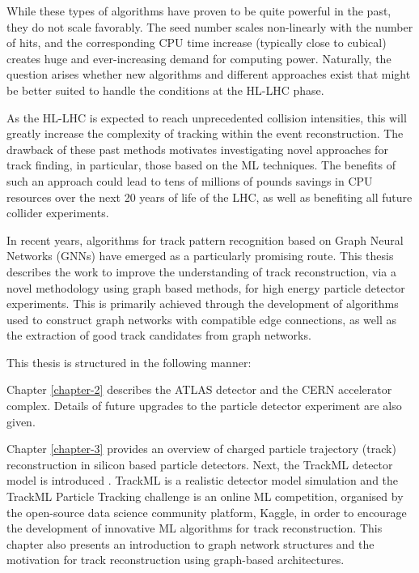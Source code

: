 While these types of algorithms have proven to be quite powerful in the past, they do not scale favorably. The seed number scales non-linearly with the number of hits, and the corresponding CPU time increase (typically close to cubical) creates huge and ever-increasing demand for computing power. Naturally, the question arises whether new algorithms and different approaches exist that might be better suited to handle the conditions at the \ac{HL-LHC} phase.

As the \ac{HL-LHC} is expected to reach unprecedented collision intensities, this will greatly increase the complexity of tracking within the event reconstruction. The drawback of these past methods motivates investigating novel approaches for track finding, in particular, those based on the \ac{ML} techniques. The benefits of such an approach could lead to tens of millions of pounds savings in CPU resources over the next 20 years of life of the \ac{LHC}, as well as benefiting all future collider experiments.

In recent years, algorithms for track pattern recognition based on Graph Neural Networks (GNNs) have emerged as a particularly promising route. This thesis describes the work to improve the understanding of track reconstruction, via a novel methodology using graph based methods, for high energy particle detector experiments. This is primarily achieved through the development of algorithms used to construct graph networks with compatible edge connections, as well as the extraction of good track candidates from graph networks. 

This thesis is structured in the following manner:

Chapter \ref{chapter-2} describes the ATLAS detector and the CERN accelerator complex. Details of future upgrades to the particle detector experiment are also given.

Chapter \ref{chapter-3} provides an overview of charged particle trajectory (track) reconstruction in silicon based particle detectors. Next, the TrackML detector model is introduced \cite{kaggle-trackml}. TrackML is a realistic detector model simulation and the TrackML Particle Tracking challenge is an online \ac{ML} competition, organised by the open-source data science community platform, Kaggle, in order to encourage the development of innovative \ac{ML} algorithms for track reconstruction. This chapter also presents an introduction to graph network structures and the motivation for track reconstruction using graph-based architectures.

